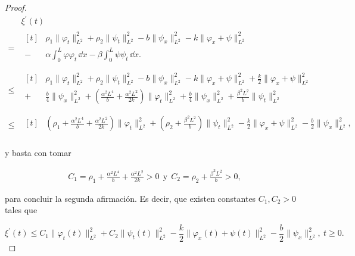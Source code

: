 \begin{proof}
    \begin{align*}
        &\xi^\prime(t)\\   
        =&\begin{aligned}[t]
            &\rho_1\lVert \varphi_t\rVert^2_{L^2} + \rho_2\lVert \psi_t\rVert^2_{L^2} -b\lVert \psi_x \rVert_{L^2}^2 -k\lVert\varphi_x + \psi\rVert^2_{L^2}\\
            -&\alpha\int_0^L\varphi\varphi_t \, \dd x - \beta\int_0^L\psi\psi_t\, \dd x.\\
        \end{aligned}\\
        \leq&\begin{aligned}[t]
            &\rho_1\lVert \varphi_t\rVert^2_{L^2} + \rho_2\lVert \psi_t\rVert^2_{L^2} -b\lVert \psi_x \rVert_{L^2}^2 -k\lVert\varphi_x + \psi\rVert^2_{L^2} + \frac{k}{2}\lVert \varphi_x + \psi\rVert^2_{L^2}\\
            +& \frac{b}{4}\lVert \psi_x \rVert^2_{L^2} + \left(\frac{\alpha^2 L^4}{b} + \frac{\alpha^2 L^2}{2k}\right)\lVert\varphi_t\rVert^2_{L^2} + \frac{b}{4} \lVert \psi_x\rVert^2_{L^2} + \frac{\beta^2L^2}{b}\lVert \psi_t \rVert^2_{L^2}\\
        \end{aligned}\\
        \leq&\begin{aligned}[t]
            &\left(\rho_1 + \frac{\alpha^2 L^4}{b} + \frac{\alpha^2 L^2}{2k}\right)\lVert \varphi_t\rVert^2_{L^2} + \left(\rho_2 + \frac{\beta^2L^2}{b} \right)\lVert \psi_t\rVert^2_{L^2} - \frac{k}{2}\lVert \varphi_x + \psi\rVert_{L^2}^2 - \frac{b}{2}\lVert \psi_x\rVert_{L^2}^2,\\
        \end{aligned}
    \end{align*}

    y basta con tomar

    \begin{align}
        \label{C1yC2}
        C_1 = \rho_1 + \frac{\alpha^2L^4}{b} + \frac{\alpha^2L^2}{2k} > 0 \ \ \text{y} \ \ C_2 = \rho_2 + \frac{\beta^2 L^2}{b} > 0,
    \end{align}

    para concluir la segunda afirmación. Es decir, que existen constantes $C_1, C_2 > 0$ tales que

    \[\xi^\prime(t) \leq C_1\lVert \varphi_t(t)\rVert^2_{L^2} + C_2\lVert \psi_t(t)\rVert^2_{L^2} - \frac{k}{2}\lVert \varphi_x(t) + \psi(t)\rVert^2_{L^2} - \frac{b}{2}\lVert \psi_x \rVert_{L^2}^2, \ t \geq 0.\]


\end{proof}
